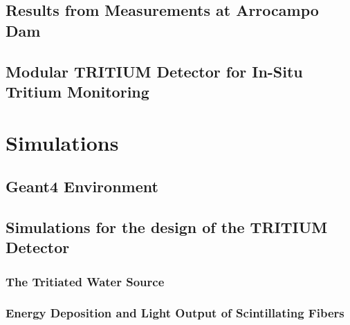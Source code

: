 \documentclass[12pt,a4paper]{book}
\begin{document}
	\section[Experimental Results in Arrocampo Dam]{Results from Measurements at Arrocampo Dam}\label{sec:ResultsArrocampo}
	
	\newpage
		
	\section[Modular TRITIUM Detector for In-Situ Tritium Monitoring]{Modular TRITIUM Detector for In-Situ Tritium Monitoring}\label{sec:TritiumMonitor}
	
	\newpage

\chapter{Simulations}  \label{chap:Simulations}	%
	
	
	\section{Geant4 Environment}\label{sec:Geant4Environment}
	
	
	\section{Simulations for the design of the TRITIUM Detector}\label{sec:TRITIUMSimulationsDesign}
	
	
		\subsection[The Tritiated Water Source]{The Tritiated Water Source}\label{subsec:SourceShapeSimulation}
		
		
		\subsection[Energy Deposition and Light Output of Scintillating Fibers]{Energy Deposition and Light Output of Scintillating Fibers}\label{subsec:LightOutputFibers}
		
		
\end{document}
